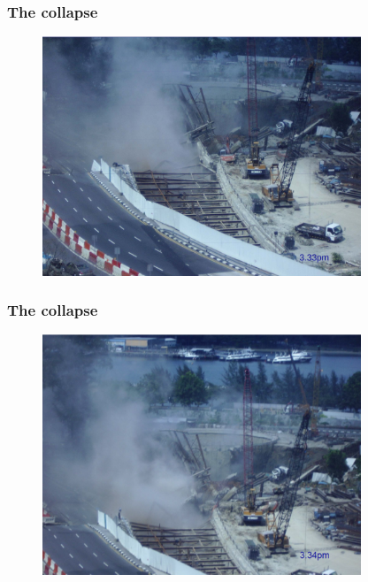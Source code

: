 \documentclass[notes]{beamer}
\begin{document}
\begin{frame}
\frametitle{The collapse}
\begin{figure}[ht]
	\centering
	\includegraphics[width=0.85\textwidth]{figs/collapse2.png}
\end{figure}
\end{frame}

\begin{frame}
\frametitle{The collapse}
\begin{figure}[ht]
	\centering
	\includegraphics[width=0.85\textwidth]{figs/collapse3.png}
\end{figure}
\end{frame}
\end{document}
